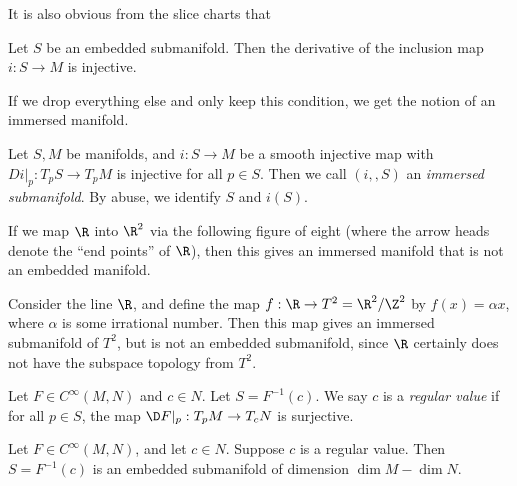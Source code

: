 \documentclass[a4paper]{article}
\begin{document}
It is also obvious from the slice charts that
\begin{prop}
  Let $S$ be an embedded submanifold. Then the derivative of the inclusion map $i: S \to M$ is injective.
\end{prop}

If we drop everything else and only keep this condition, we get the notion of an immersed manifold.

\begin{defi}
  Let $S, M$ be manifolds, and $i: S \to M$ be a smooth injective map with $Di|_p : T_p S \to T_p M$ is injective for all $p \in S$. Then we call $(i,, S)$ an \emph{immersed submanifold}. By abuse, we identify $S$ and $i(S)$.
\end{defi}

\begin{eg}
  If we map $\R$ into $\R^2$ via the following figure of eight (where the arrow heads denote the ``end points'' of $\R$), then this gives an immersed manifold that is not an embedded manifold.
  \begin{center}
  \end{center}
\end{eg}

\begin{eg}
  Consider the line $\R$, and define the map $f: \R \to T^2 = \R^2 / \Z^2$ by $f(x) = \alpha x$, where $\alpha$ is some irrational number. Then this map gives an immersed submanifold of $T^2$, but is not an embedded submanifold, since $\R$ certainly does not have the subspace topology from $T^2$.
\end{eg}

\begin{defi}
  Let $F \in C^\infty(M, N)$ and $c \in N$. Let $S = F^{-1}(c)$. We say $c$ is a \emph{regular value} if for all $p \in S$, the map $\D F|_p: T_p M \to T_c N$ is surjective.
\end{defi}

\begin{prop}
  Let $F \in C^\infty(M, N)$, and let $c \in N$. Suppose $c$ is a regular value. Then $S = F^{-1}(c)$ is an embedded submanifold of dimension $\dim M - \dim N$.
\end{prop}
\end{document}
